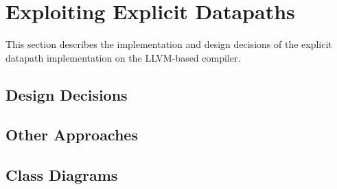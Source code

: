 



\section{Exploiting Explicit Datapaths}\label{sec:expl_bp_impl}
This section describes the implementation and design decisions of the explicit datapath implementation on the LLVM-based compiler.

\subsection{Design Decisions}\label{sec:design_decisions}



\subsection{Other Approaches}\label{sec:approaches}


\subsection{Class Diagrams}\label{sec:explicit_impl}


